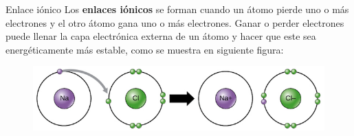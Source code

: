\begin{infocard}{Enlace iónico}
    Los \textbf{enlaces iónicos} se forman cuando un átomo pierde uno o más electrones y el otro átomo gana uno o más electrones.
    Ganar o perder electrones puede llenar la capa electrónica externa de un átomo y hacer que este sea energéticamente más estable, como se muestra en siguiente figura:

    \begin{figure}[H]
        \centering
        \includegraphics[width=\linewidth]{../images/a05bd453d0dc5add39892ed10f63bc92a5508539}
    \end{figure}
\end{infocard}